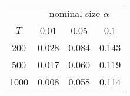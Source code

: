 % 
\begin{tabular}{cccc}
  \hline
  & \multicolumn{3}{c}{nominal size $\alpha$} \\
 $T$ & 0.01 & 0.05 & 0.1 \\
 \hline
200 & 0.028 & 0.084 & 0.143 \\ 
  500 & 0.017 & 0.060 & 0.119 \\ 
  1000 & 0.008 & 0.058 & 0.114 \\ 
   \hline
\end{tabular}
